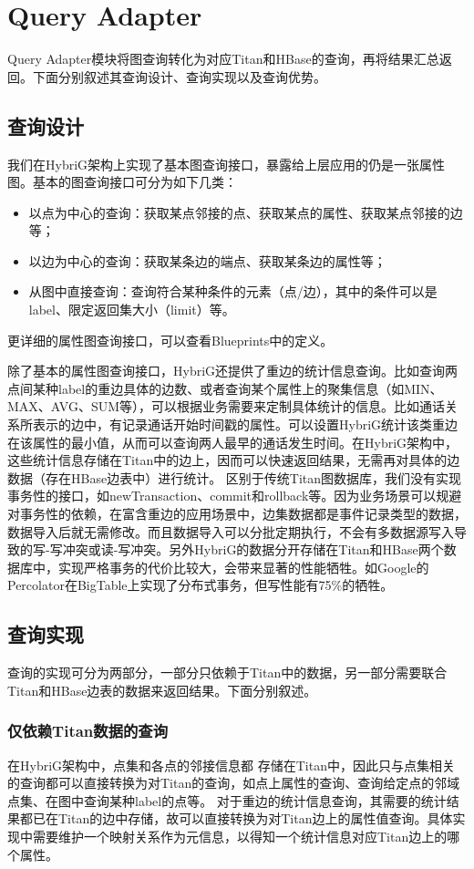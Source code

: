 
\chapter{Query Adapter}
Query Adapter模块将图查询转化为对应Titan和HBase的查询，再将结果汇总返回。下面分别叙述其查询设计、查询实现以及查询优势。
\section{查询设计}
我们在HybriG架构上实现了基本图查询接口，暴露给上层应用的仍是一张属性图。基本的图查询接口可分为如下几类：
\begin{itemize}
	\item 以点为中心的查询：获取某点邻接的点、获取某点的属性、获取某点邻接的边等；
	\item 以边为中心的查询：获取某条边的端点、获取某条边的属性等；
	\item 从图中直接查询：查询符合某种条件的元素（点/边），其中的条件可以是label、限定返回集大小（limit）等。
\end{itemize}
更详细的属性图查询接口，可以查看Blueprints中的定义。

除了基本的属性图查询接口，HybriG还提供了重边的统计信息查询。比如查询两点间某种label的重边具体的边数、或者查询某个属性上的聚集信息（如MIN、MAX、AVG、SUM等），可以根据业务需要来定制具体统计的信息。比如通话关系所表示的边中，有记录通话开始时间戳的属性。可以设置HybriG统计该类重边在该属性的最小值，从而可以查询两人最早的通话发生时间。在HybriG架构中，这些统计信息存储在Titan中的边上，因而可以快速返回结果，无需再对具体的边数据（存在HBase边表中）进行统计。
区别于传统Titan图数据库，我们没有实现事务性的接口，如newTransaction、commit和rollback等。因为业务场景可以规避对事务性的依赖，在富含重边的应用场景中，边集数据都是事件记录类型的数据，数据导入后就无需修改。而且数据导入可以分批定期执行，不会有多数据源写入导致的写-写冲突或读-写冲突。另外HybriG的数据分开存储在Titan和HBase两个数据库中，实现严格事务的代价比较大，会带来显著的性能牺牲。如Google的Percolator\supercite{percolator}在BigTable上实现了分布式事务，但写性能有75\%的牺牲。

\section{查询实现}
查询的实现可分为两部分，一部分只依赖于Titan中的数据，另一部分需要联合Titan和HBase边表的数据来返回结果。下面分别叙述。
\subsection{仅依赖Titan数据的查询}
在HybriG架构中，点集和各点的邻接信息都
存储在Titan中，因此只与点集相关的查询都可以直接转换为对Titan的查询，如点上属性的查询、查询给定点的邻域点集、在图中查询某种label的点等。
对于重边的统计信息查询，其需要的统计结果都已在Titan的边中存储，故可以直接转换为对Titan边上的属性值查询。具体实现中需要维护一个映射关系作为元信息，以得知一个统计信息对应Titan边上的哪个属性。
